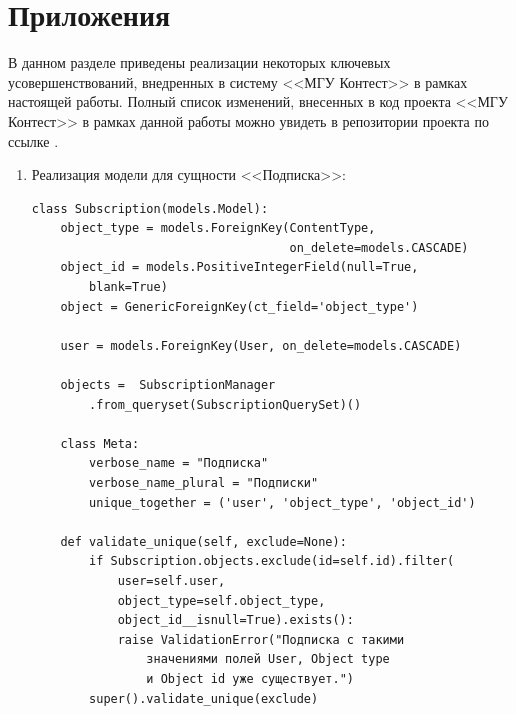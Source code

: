 \documentclass[14pt, a4paper, oneside]{extarticle}
\begin{document}
\linespread{1.2}
\section{Приложения}
В данном разделе приведены реализации некоторых ключевых усовершенствований, внедренных в систему <<МГУ Контест>> в рамках настоящей работы. Полный список изменений, внесенных в код \cite{msu-contest} проекта <<МГУ Контест>> в рамках данной работы можно увидеть в репозитории проекта по ссылке \cite{msu-contest-commits}.

\begin{enumerate}[wide, labelindent=0pt]
    \item {
        Реализация модели для сущности <<Подписка>>:\label{code:subscription}
        \begin{verbatim}
class Subscription(models.Model):
    object_type = models.ForeignKey(ContentType, 
                                    on_delete=models.CASCADE)
    object_id = models.PositiveIntegerField(null=True, 
        blank=True)
    object = GenericForeignKey(ct_field='object_type')

    user = models.ForeignKey(User, on_delete=models.CASCADE)

    objects =  SubscriptionManager
        .from_queryset(SubscriptionQuerySet)()

    class Meta:
        verbose_name = "Подписка"
        verbose_name_plural = "Подписки"
        unique_together = ('user', 'object_type', 'object_id')

    def validate_unique(self, exclude=None):
        if Subscription.objects.exclude(id=self.id).filter(
            user=self.user, 
            object_type=self.object_type, 
            object_id__isnull=True).exists():
            raise ValidationError("Подписка с такими
                значениями полей User, Object type 
                и Object id уже существует.")
        super().validate_unique(exclude)


\end{verbatim}}
\end{enumerate}
\end{document}
